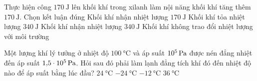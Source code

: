\begin{ex}
	Thực hiện công $\SI{170}{\joule}$ lên khối khí trong xilanh làm nội năng khối khí tăng thêm $\SI{170}{\joule}$. Chọn kết luận đúng
	\choice
	{Khối khí nhận nhiệt lượng $\SI{170}{\joule}$}
	{Khối khí tỏa nhiệt lượng $\SI{340}{\joule}$}
	{Khối khí nhận nhiệt lượng $\SI{340}{\joule}$}
	{\True Khối khí không trao đổi nhiệt lượng với môi trường}
	\loigiai{}
\end{ex}
\begin{ex}
	Một lượng khí lý tưởng ở nhiệt độ $\SI{100}{\celsius}$ và áp suất $\SI{E5}{\pascal}$ được nén đẳng nhiệt đến áp suất $\SI{1.5E5}{\pascal}$. Hỏi sau đó phải làm lạnh đẳng tích khí đó đến nhiệt độ nào để áp suất bằng lúc đầu?
	\choice
	{$\SI{24}{\celsius}$}
	{\True $\SI{-24}{\celsius}$}
	{$\SI{-12}{\celsius}$}
	{$\SI{36}{\celsius}$}
\end{ex}
